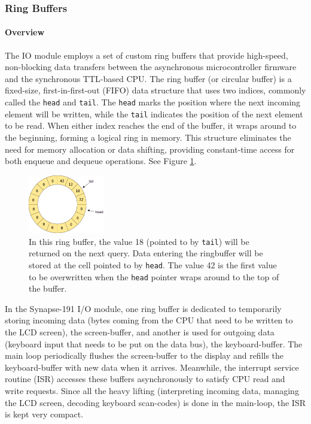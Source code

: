 \subsubsection{Ring Buffers}
\paragraph{Overview} The IO module employs a set of custom ring buffers that provide high-speed, non-blocking data transfers between the asynchronous microcontroller firmware and the synchronous TTL-based CPU. The ring buffer (or circular buffer) is a fixed-size, first-in-first-out (FIFO) data structure that uses two indices, commonly called the \texttt{head} and \texttt{tail}. The \texttt{head} marks the position where the next incoming element will be written, while the \texttt{tail} indicates the position of the next element to be read. When either index reaches the end of the buffer, it wraps around to the beginning, forming a logical ring in memory. This structure eliminates the need for memory allocation or data shifting, providing constant-time access for both enqueue and dequeue operations. See Figure \ref{fig:ringbuffer}.

\begin{figure}[H]
  \centering
  \includegraphics[width=0.3\textwidth]{img/ringbuffer}
  \caption{In this ring buffer, the value 18 (pointed to by \texttt{tail}) will be returned on the next query. Data entering the ringbuffer will be stored at the cell pointed to by \texttt{head}. The value 42 is the first value to be overwritten when the \texttt{head} pointer wraps around to the top of the buffer.}
  \label{fig:ringbuffer}
\end{figure}


In the Synapse-191 I/O module, one ring buffer is dedicated to temporarily storing incoming data (bytes coming from the CPU that need to be written to the LCD screen), the screen-buffer, and another is used for outgoing data (keyboard input that needs to be put on the data bus), the keyboard-buffer. The main loop periodically flushes the screen-buffer to the display and refills the keyboard-buffer with new data when it arrives. Meanwhile, the interrupt service routine (ISR) accesses these buffers asynchronously to satisfy CPU read and write requests. Since all the heavy lifting (interpreting incoming data, managing the LCD screen, decoding keyboard scan-codes) is done in the main-loop, the ISR is kept very compact.

